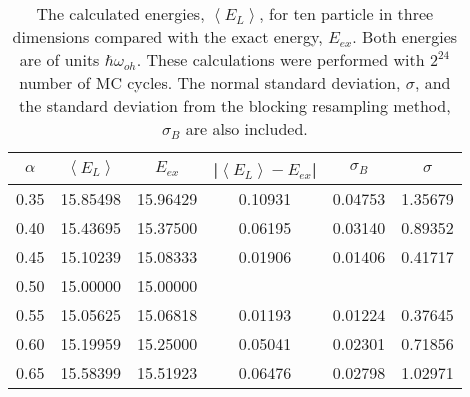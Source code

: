 \begin{table}[H]\caption{The calculated energies, $\left<E_L\right>$, for ten particle in three dimensions compared with the exact energy, $E_{ex}$. Both energies are of units $\hbar\omega_{oh}$. These calculations were performed with $2^{24}$ number of MC cycles. The normal standard deviation, $\sigma$, and the standard deviation from the blocking resampling method, $\sigma_B$ are also included.}\label{tab:brute_force_N_10_MC_boost}
\center
\begin{tabular}{cccccc}
$\alpha$ & $\left< E_L \right>$ & $E_{ex}$ & |$\left< E_L \right>-E_{ex}$|  & $\sigma_B$ & $\sigma$\\ \hline
0.35 & 15.85498 & 15.96429 & 0.10931 & 0.04753 & 1.35679\\
0.40 & 15.43695 & 15.37500 & 0.06195 & 0.03140 & 0.89352\\
0.45 & 15.10239 & 15.08333 & 0.01906 & 0.01406 & 0.41717\\
0.50 & 15.00000 & 15.00000 &                &                &                \\
0.55 & 15.05625 & 15.06818 & 0.01193 & 0.01224 & 0.37645\\
0.60 & 15.19959 & 15.25000 & 0.05041 & 0.02301 & 0.71856\\
0.65 & 15.58399 & 15.51923 & 0.06476 & 0.02798 & 1.02971\\
\end{tabular}
\end{table} 
